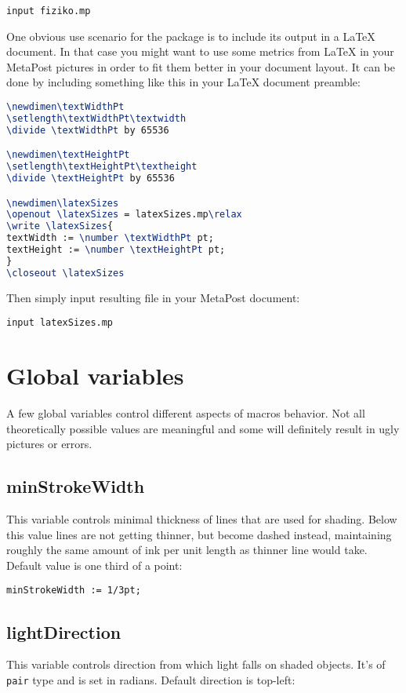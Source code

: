 \documentclass{article}
\begin{document}
\begin{empfile}
\begin{lstlisting}
input fiziko.mp
\end{lstlisting}

One obvious use scenario for the package is to include its output in a LaTeX document. In that case you might want to use some metrics from LaTeX in your MetaPost pictures in order to fit them better in your document layout. It can be done by including something like this in your LaTeX document preamble:

\begin{lstlisting}[language=TeX]
\newdimen\textWidthPt
\setlength\textWidthPt\textwidth
\divide \textWidthPt by 65536

\newdimen\textHeightPt
\setlength\textHeightPt\textheight
\divide \textHeightPt by 65536

\newdimen\latexSizes
\openout \latexSizes = latexSizes.mp\relax
\write \latexSizes{
textWidth := \number \textWidthPt pt;
textHeight := \number \textHeightPt pt;
}
\closeout \latexSizes
\end{lstlisting}

Then simply input resulting file in your MetaPost document:

\begin{lstlisting}
input latexSizes.mp
\end{lstlisting}


\section{Global variables}
A few global variables control different aspects of macros behavior. Not all theoretically possible values are meaningful and some will definitely result in ugly pictures or errors.

\subsection{minStrokeWidth}
This variable controls minimal thickness of lines that are used for shading. Below this value lines are not getting thinner, but become dashed instead, maintaining roughly the same amount of ink per unit length as thinner line would take. Default value is one third of a point:

\begin{lstlisting}
minStrokeWidth := 1/3pt;
\end{lstlisting}

\subsection{lightDirection}
This variable controls direction from which light falls on shaded objects. It's of \texttt{pair} type and is set in radians. Default direction is top-left:


\end{empfile}
\end{document}
